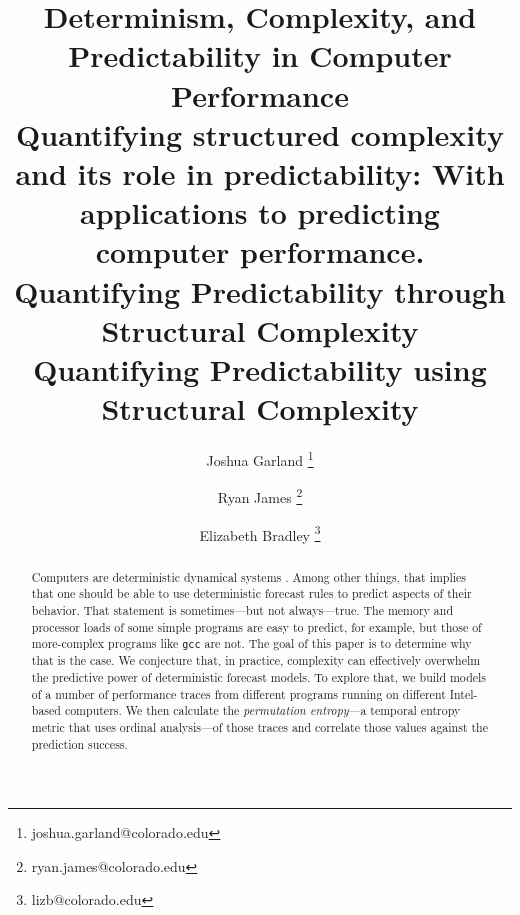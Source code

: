 \documentclass{article}
\title{Determinism, Complexity, and Predictability in Computer Performance\\
Quantifying structured complexity and its role in predictability: With applications to predicting computer performance.
\\ Quantifying Predictability through Structural Complexity
\\ Quantifying Predictability using Structural Complexity
}
\author[1]{Joshua Garland \thanks{joshua.garland@colorado.edu}}
\author[1]{Ryan James \thanks{ryan.james@colorado.edu}}
\author[1,2]{Elizabeth Bradley \thanks{lizb@colorado.edu}}
\affil[1]{Department of Computer Science\\
  University of Colorado at Boulder\\
  Colorado, USA
}
\affil[2]{Santa Fe Institute\\
  New Mexico, USA
}
\begin{document}
\maketitle





\begin{abstract}
  Computers are deterministic dynamical systems \cite{mytkowicz09}.
  Among other things, that implies that one should be able to use
  deterministic forecast rules to predict aspects of their behavior.
  That statement is sometimes---but not always---true. The memory and
  processor loads of some simple programs are easy to predict, for
  example, but those of more-complex programs like {\tt gcc} are not.
  The goal of this paper is to determine why that is the case. We
  conjecture that, in practice, complexity can effectively overwhelm
  the predictive power of deterministic forecast models. To explore
  that, we build models of a number of performance traces from
  different programs running on different Intel-based computers. We
  then calculate the \emph{permutation entropy}---a temporal entropy
  metric that uses ordinal analysis---of those traces and correlate
  those values against the prediction success.
\end{abstract}
\end{document}
